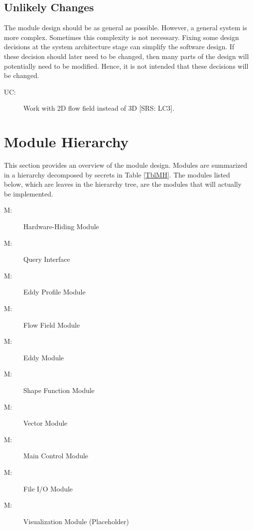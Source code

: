\documentclass[12pt, titlepage]{article}
\newcounter{ucnum}
\newcommand{\uctheucnum}{UC\theucnum}
\newcounter{mnum}
\newcommand{\mthemnum}{M\themnum}
\begin{document}
\subsection{Unlikely Changes} \label{SecUchange}

The module design should be as general as possible. However, a general system is
more complex. Sometimes this complexity is not necessary. Fixing some design
decisions at the system architecture stage can simplify the software design. If
these decision should later need to be changed, then many parts of the design
will potentially need to be modified. Hence, it is not intended that these
decisions will be changed.

\begin{description}
\item[ \uctheucnum \label{uc2D}:] Work with 2D flow field instead of 3D [SRS: LC3].
\end{description}

\section{Module Hierarchy} \label{SecMH}

This section provides an overview of the module design. Modules are summarized
in a hierarchy decomposed by secrets in Table \ref{TblMH}. The modules listed
below, which are leaves in the hierarchy tree, are the modules that will
actually be implemented.

\begin{description}
\item [ \mthemnum \label{mHH}:] Hardware-Hiding Module
\item [ \mthemnum \label{mQuery}:] Query Interface
\item [ \mthemnum \label{mProf}:] Eddy Profile Module
\item [ \mthemnum \label{mFlow}:] Flow Field Module
\item [ \mthemnum \label{mEddy}:] Eddy Module
\item [ \mthemnum \label{mShape}:] Shape Function Module
\item [ \mthemnum \label{mVector}:] Vector Module
\item [ \mthemnum \label{mMain}:] Main Control Module
\item [ \mthemnum \label{mFile}:] File I/O Module
\item [ \mthemnum \label{mVisual}:] Visualization Module (Placeholder)
\end{description}
\end{document}
